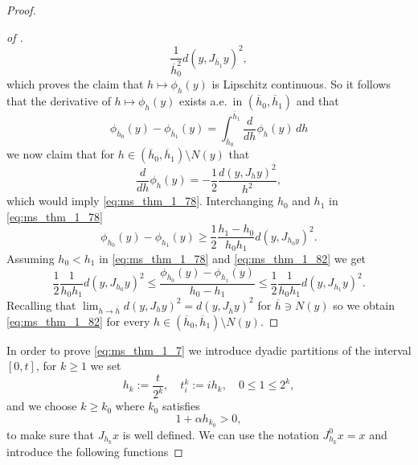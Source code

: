 \documentclass[a4paper,11pt, leqno]{scrreprt} %
\renewcommand{\leq}{\leqslant}
\renewcommand{\leq}{\leqslant}
\renewcommand{\geq}{\geqslant}
\theoremstyle{change}
\theoremstyle{nonumberplain}
\newtheorem{proof}{Proof}
\begin{document}
\begin{proof}
\begin{proof}[of ]
\begin{equation}
      \frac1{\overline h_0^2} d(y, J_{\overline h_1} y)^2,
    \end{equation}
    which proves the claim that $h \mapsto \phi_h(y)$ is Lipschitz
    continuous. So it follows that the derivative of $h \mapsto
    \phi_h(y)$ exists a.e.\ in $(\overline h_0, \overline h_1)$ and
    that
    \begin{equation}
      \label{eq:ms_thm_1_81}
      \phi_{\overline h_0}(y) - \phi_{\overline h_1}(y) =
      \int_{\overline h_0}^{\overline h_1} \frac{d}{dh} \phi_h(y) \, dh
    \end{equation}
    we now claim that for $h \in (\overline h_0, \overline h_1)
    \setminus N(y)$ that
    \begin{equation}
      \label{eq:ms_thm_1_82}
      \frac{d}{dh} \phi_h(y) = -\frac12 \frac{d(y, J_h y)^2}{h^2},
    \end{equation}
    which would imply \eqref{eq:ms_thm_1_78}. Interchanging $h_0$ and
    $h_1$ in \eqref{eq:ms_thm_1_78}
    \begin{equation}
      \label{eq:ms_thm_1_82}
       \phi_{h_0}(y) - \phi_{h_1}(y) \geq \frac12 \frac{h_1 - h_0}{h_0 h_1} d(y, J_{h_0 y})^2.
    \end{equation}
    Assuming $h_0 < h_1$ in \eqref{eq:ms_thm_1_78} and
    \eqref{eq:ms_thm_1_82} we get
    \begin{equation}
      \label{eq:ms_thm_1_83}
      \frac12 \frac1{h_0 h_1} d(y, J_{h_0} y)^2 \leq
      \frac{\phi_{h_0}(y) - \phi_{h_1}(y)}{h_0 - h_1} \leq \frac12
      \frac1{h_0 h_1} d(y, J_{h_1} y)^2.
    \end{equation}
    Recalling that $\lim_{h \to \overline h} d(y, J_h y)^2 = d(y,
    J_{\overline h} y)^2$ for $\overline h \ni N(y)$ so we obtain
    \eqref{eq:ms_thm_1_82} for every $h \in (\overline h_0, \overline
    h_1) \setminus N(y)$.
  \end{proof}
  In order to prove \eqref{eq:ms_thm_1_7} we introduce dyadic
  partitions of the interval $[0,t]$, for $k \geq 1$ we set
  \begin{equation}
    \label{eq:ms_thm_1_84}
      h_k := \frac{t}{2^k}, \quad t_i^k := i h_k, \quad 0 \leq 1 \leq 2^k,
  \end{equation}
  and we choose $k \geq k_0$ where $k_0$ satisfies
  \begin{equation}
    \label{eq:ms_thm_1_85}
    1 + \alpha h_{k_0} > 0,
  \end{equation}
  to make sure that $J_{h_k} x$ is well defined. We can use the
  notation $J_{h_k}^0 x = x$ and introduce the following functions

\end{proof}
\end{document}
